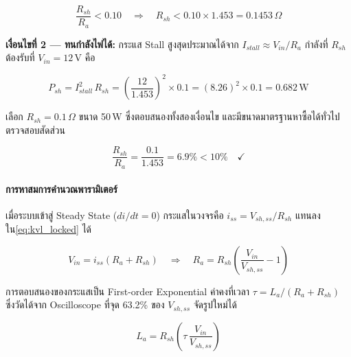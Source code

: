 \begin{equation}
    \frac{R_{sh}}{R_a} < 0.10
    \quad\Rightarrow\quad
    R_{sh} < 0.10 \times 1.453 = 0.1453\,\Omega
    \label{eq:rsh_cond1}
\end{equation}

\textbf{เงื่อนไขที่ 2 --- ทนกำลังไฟได้:}
กระแส Stall สูงสุดประมาณได้จาก $I_{stall} \approx V_{in}/R_a$
กำลังที่ $R_{sh}$ ต้องรับที่ $V_{in} = 12$\,V คือ

\begin{equation}
    P_{sh} = I_{stall}^2\,R_{sh}
           = \left(\frac{12}{1.453}\right)^2 \times 0.1
           = (8.26)^2 \times 0.1
           = 0.682\,\text{W}
    \label{eq:rsh_power}
\end{equation}

เลือก $R_{sh} = 0.1\,\Omega$ ขนาด 50\,W ซึ่งตอบสนองทั้งสองเงื่อนไข
และมีขนาดมาตรฐานหาซื้อได้ทั่วไป
ตรวจสอบสัดส่วน

\begin{equation}
    \frac{R_{sh}}{R_a} = \frac{0.1}{1.453} = 6.9\% < 10\%
    \quad\checkmark
    \label{eq:rsh_ratio}
\end{equation}

\paragraph{การหาสมการคำนวณพารามิเตอร์}

เมื่อระบบเข้าสู่ Steady State ($di/dt = 0$)
กระแสในวงจรคือ $i_{ss} = V_{sh,ss}/R_{sh}$
แทนลงใน\cref{eq:kvl_locked} ได้

\begin{equation}
    V_{in} = i_{ss}(R_a + R_{sh})
    \quad\Rightarrow\quad
    R_a = R_{sh}\!\left(\frac{V_{in}}{V_{sh,ss}} - 1\right)
    \label{eq:calc_Ra_ch3}
\end{equation}

การตอบสนองของกระแสเป็น First-order Exponential
ค่าคงที่เวลา $\tau = L_a/(R_a + R_{sh})$
ซึ่งวัดได้จาก Oscilloscope ที่จุด 63.2\% ของ $V_{sh,ss}$
จัดรูปใหม่ได้

\begin{equation}
    L_a = R_{sh}\!\left(\tau\,\frac{V_{in}}{V_{sh,ss}}\right)
    \label{eq:calc_La_ch3}
\end{equation}


